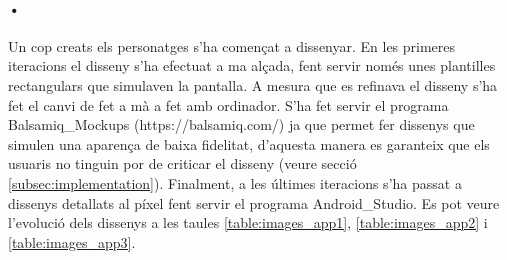 \paragraph{•}
Un cop creats els personatges s'ha començat a dissenyar. En les primeres iteracions el disseny s'ha efectuat a ma alçada, fent servir només unes plantilles rectangulars que simulaven la pantalla. A mesura que es refinava el disseny s'ha fet el canvi de fet a mà a fet amb ordinador. S'ha fet servir el programa \gls{Balsamiq_Mockups} (https://balsamiq.com/) ja que permet fer dissenys que simulen una aparença de baixa fidelitat, d'aquesta manera es garanteix que els usuaris no tinguin por de criticar el disseny (veure secció \ref{subsec:implementation}). Finalment, a les últimes iteracions s'ha passat a dissenys detallats al píxel fent servir el programa \gls{Android_Studio}. Es pot veure l'evolució dels dissenys a les taules \ref{table:images_app1}, \ref{table:images_app2} i \ref{table:images_app3}.


